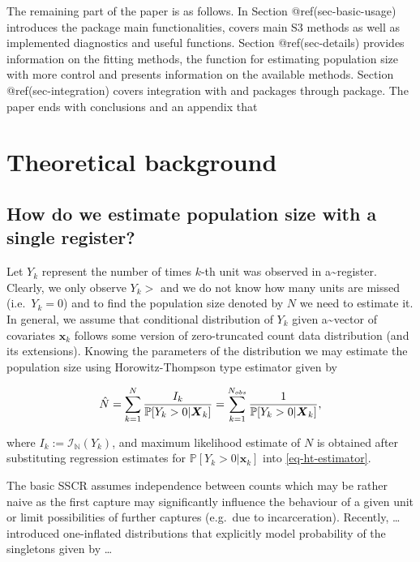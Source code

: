 \documentclass[
]{jss}
\newcommand{\1}{\mathcal{I}} \newcommand{\bZero}{\boldsymbol{0}}
\begin{document}
The remaining part of the paper is as follows. In Section
@ref(sec-basic-usage) introduces the package main functionalities,
covers main S3 methods as well as implemented diagnostics and useful
functions. Section @ref(sec-details) provides information on the fitting
methods, the  function for estimating
population size with more control and presents information on the
available methods. Section @ref(sec-integration) covers integration with
 and  packages through 
package. The paper ends with conclusions and an appendix that

\section{Theoretical background}\label{theoretical-background}

\subsection{How do we estimate population size with a single
register?}\label{how-do-we-estimate-population-size-with-a-single-register}

Let \(Y_{k}\) represent the number of times \(k\)-th unit was observed
in a\textasciitilde register. Clearly, we only observe \(Y_{k}>\) and we
do not know how many units are missed (i.e.~\(Y_{k}=0\)) and to find the
population size denoted by \(N\) we need to estimate it. In general, we
assume that conditional distribution of \(Y_{k}\) given
a\textasciitilde vector of covariates \(\boldsymbol{x}_{k}\) follows
some version of zero-truncated count data distribution (and its
extensions). Knowing the parameters of the distribution we may estimate
the population size using Horowitz-Thompson type estimator given by

\begin{equation}
    \hat{N}=
    \sum_{k=1}^{N}\frac{I_{k}}{\mathbb{P}[Y_{k}>0|\boldsymbol{X}_{k}]}=
    \sum_{k=1}^{N_{obs}}\frac{1}{\mathbb{P}[Y_{k}>0|\boldsymbol{X}_{k}]},
    \label{eq-ht-estimator}
\end{equation}

where \(I_{k}:=\mathcal{I}_{\mathbb{N}}(Y_{k})\), and maximum likelihood
estimate of \(N\) is obtained after substituting regression estimates
for \(\mathbb{P}[Y_{k}>0|\boldsymbol{x}_{k}]\) into
\eqref{eq-ht-estimator}.

The basic SSCR assumes independence between counts which may be rather
naive as the first capture may significantly influence the behaviour of
a given unit or limit possibilities of further captures (e.g.~due to
incarceration). Recently, \ldots{} introduced one-inflated distributions
that explicitly model probability of the singletons given by \ldots{}
\end{document}
